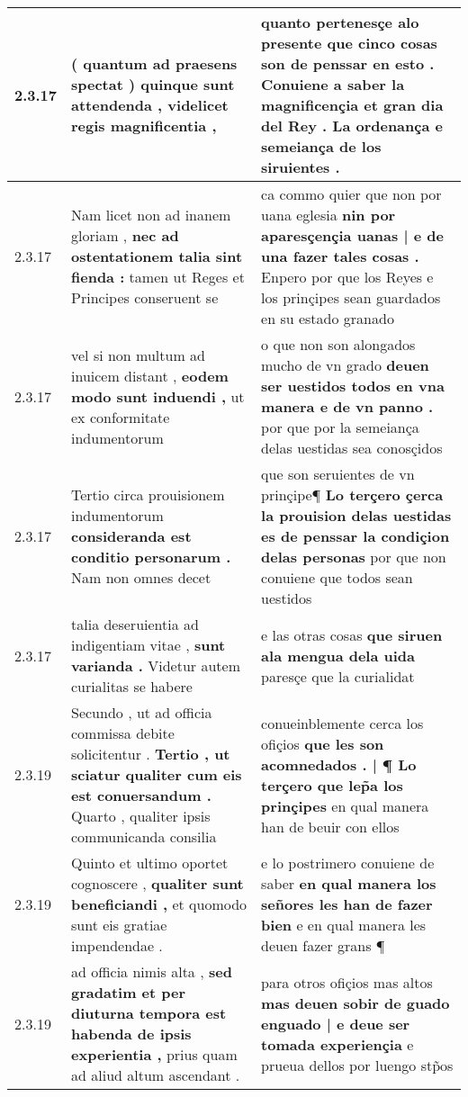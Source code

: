 \begin{tabular}{|p{1cm}|p{6.5cm}|p{6.5cm}|}
2.3.17 & ( quantum ad praesens spectat ) \textbf{ quinque sunt attendenda , } videlicet regis magnificentia , & quanto pertenesçe alo presente \textbf{ que cinco cosas son de penssar en esto . Conuiene a saber la magnificençia et gran dia del Rey . } La ordenança e semeiança de los siruientes . \\\hline
2.3.17 & Nam licet non ad inanem gloriam , \textbf{ nec ad ostentationem talia sint fienda : } tamen ut Reges et Principes conseruent se & ca commo quier que non por uana eglesia \textbf{ nin por aparesçençia uanas | e de una fazer tales cosas . } Enpero por que los Reyes e los prinçipes sean guardados en su estado granado \\\hline
2.3.17 & vel si non multum ad inuicem distant , \textbf{ eodem modo sunt induendi , } ut ex conformitate indumentorum & o que non son alongados mucho de vn grado \textbf{ deuen ser uestidos todos en vna manera e de vn panno . } por que por la semeiança delas uestidas sea conosçidos \\\hline
2.3.17 & Tertio circa prouisionem indumentorum \textbf{ consideranda est conditio personarum . } Nam non omnes decet & que son seruientes de vn prinçipe¶ \textbf{ Lo terçero çerca la prouision delas uestidas es de penssar la condiçion delas personas } por que non conuiene que todos sean uestidos \\\hline
2.3.17 & talia deseruientia ad indigentiam vitae , \textbf{ sunt varianda . } Videtur autem curialitas se habere & e las otras cosas \textbf{ que siruen ala mengua dela uida } paresçe que la curialidat \\\hline
2.3.19 & Secundo , ut ad officia commissa debite solicitentur . \textbf{ Tertio , ut sciatur qualiter cum eis est conuersandum . } Quarto , qualiter ipsis communicanda consilia & conueinblemente cerca los ofiçios \textbf{ que les son acomnedados . | ¶ Lo terçero que lep̃a los prinçipes } en qual manera han de beuir con ellos \\\hline
2.3.19 & Quinto et ultimo oportet cognoscere , \textbf{ qualiter sunt beneficiandi , } et quomodo sunt eis gratiae impendendae . & e lo postrimero conuiene de saber \textbf{ en qual manera los señores les han de fazer bien } e en qual manera les deuen fazer grans ¶ \\\hline
2.3.19 & ad officia nimis alta , \textbf{ sed gradatim et per diuturna tempora est habenda de ipsis experientia , } prius quam ad aliud altum ascendant . & para otros ofiçios mas altos \textbf{ mas deuen sobir de guado enguado | e deue ser tomada experiençia } e prueua dellos por luengo stp̃os \\\hline

\end{tabular}
